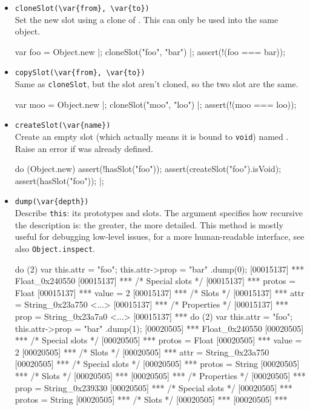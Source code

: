 \begin{itemize}
\item \lstinline|cloneSlot(\var{from}, \var{to})|\\
  Set the new slot  using a clone of . This can only
  be used into the same object.

\begin{urbiscript}[firstnumber=last]
var foo = Object.new |;
cloneSlot("foo", "bar") |;
assert(!(foo === bar));
\end{urbiscript}

\item \lstinline|copySlot(\var{from}, \var{to})|\\
  Same as \lstinline|cloneSlot|, but the slot aren't cloned, so the
  two slot are the same.

\begin{urbiscript}[firstnumber=last]
var moo = Object.new |;
cloneSlot("moo", "loo") |;
assert(!(moo === loo));
\end{urbiscript}

\item \lstinline|createSlot(\var{name})|\\
  Create an empty slot (which actually means it is bound to
  \lstinline|void|) named .  Raise an error if 
  was already defined.
\begin{urbiscript}[firstnumber=last]
do (Object.new)
{
  assert(!hasSlot("foo"));
  assert(createSlot("foo").isVoid);
  assert(hasSlot("foo"));
}|;
\end{urbiscript}

\item \lstinline|dump(\var{depth})|\\
  Describe \lstinline|this|: its prototypes and slots.  The argument
   specifies how recursive the description is: the greater,
  the more detailed.  This method is mostly useful for debugging
  low-level issues, for a more human-readable interface, see also
  \lstinline|Object.inspect|.
\begin{urbiscript}[firstnumber=last]
do (2) { var this.attr = "foo"; this.attr->prop = "bar" }.dump(0);
[00015137] *** Float_0x240550 {
[00015137] ***   /* Special slots */
[00015137] ***   protos = Float
[00015137] ***   value = 2
[00015137] ***   /* Slots */
[00015137] ***   attr = String_0x23a750 <...>
[00015137] ***     /* Properties */
[00015137] ***     prop = String_0x23a7a0 <...>
[00015137] ***   }
do (2) { var this.attr = "foo"; this.attr->prop = "bar" }.dump(1);
[00020505] *** Float_0x240550 {
[00020505] ***   /* Special slots */
[00020505] ***   protos = Float
[00020505] ***   value = 2
[00020505] ***   /* Slots */
[00020505] ***   attr = String_0x23a750 {
[00020505] ***     /* Special slots */
[00020505] ***     protos = String
[00020505] ***     /* Slots */
[00020505] ***     }
[00020505] ***     /* Properties */
[00020505] ***     prop = String_0x239330 {
[00020505] ***       /* Special slots */
[00020505] ***       protos = String
[00020505] ***       /* Slots */
[00020505] ***       }
[00020505] ***   }
\end{urbiscript}


\end{itemize}
